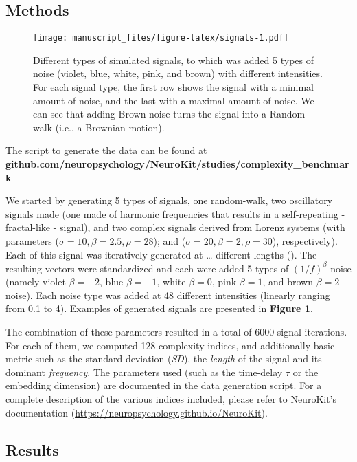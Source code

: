\documentclass[
  man]{apa6}
\begin{document}
\hypertarget{methods}{%
\subsection{Methods}\label{methods}}

\begin{figure}
\centering
\texttt{[image: manuscript\_files/figure-latex/signals-1.pdf]}
\caption{\label{fig:signals}Different types of simulated signals, to which was added 5 types of noise (violet, blue, white, pink, and brown) with different intensities. For each signal type, the first row shows the signal with a minimal amount of noise, and the last with a maximal amount of noise. We can see that adding Brown noise turns the signal into a Random-walk (i.e., a Brownian motion).}
\end{figure}

The script to generate the data can be found at \textbf{github.com/neuropsychology/NeuroKit/studies/complexity\_benchmark}

We started by generating 5 types of signals, one random-walk, two oscillatory signals made (one made of harmonic frequencies that results in a self-repeating - fractal-like - signal), and two complex signals derived from Lorenz systems (with parameters (\(\sigma = 10, \beta = 2.5, \rho = 28\)); and (\(\sigma = 20, \beta = 2, \rho = 30\)), respectively). Each of this signal was iteratively generated at \ldots{} different lengths (). The resulting vectors were standardized and each were added 5 types of \((1/f)^\beta\) noise (namely violet \(\beta=-2\), blue \(\beta=-1\), white \(\beta=0\), pink \(\beta=1\), and brown \(\beta=2\) noise). Each noise type was added at 48 different intensities (linearly ranging from 0.1 to 4). Examples of generated signals are presented in \textbf{Figure 1}.

The combination of these parameters resulted in a total of 6000 signal iterations. For each of them, we computed 128 complexity indices, and additionally basic metric such as the standard deviation (\emph{SD}), the \emph{length} of the signal and its dominant \emph{frequency}. The parameters used (such as the time-delay \(\tau\) or the embedding dimension) are documented in the data generation script. For a complete description of the various indices included, please refer to NeuroKit's documentation (\url{https://neuropsychology.github.io/NeuroKit}).

\hypertarget{results}{%
\subsection{Results}\label{results}}
\end{document}
